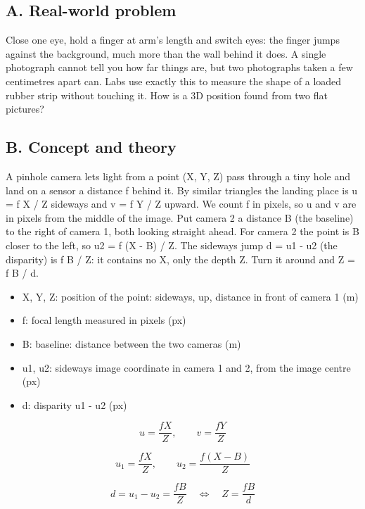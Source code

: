 \documentclass[11pt,a4paper]{article}
\begin{document}
\subsection*{A. Real-world problem}
Close one eye, hold a finger at arm's length and switch eyes: the finger jumps against the background, much more than the wall behind it does. A single photograph cannot tell you how far things are, but two photographs taken a few centimetres apart can. Labs use exactly this to measure the shape of a loaded rubber strip without touching it. How is a 3D position found from two flat pictures?

\subsection*{B. Concept and theory}
A pinhole camera lets light from a point (X, Y, Z) pass through a tiny hole and land on a sensor a distance f behind it. By similar triangles the landing place is u = f X / Z sideways and v = f Y / Z upward. We count f in pixels, so u and v are in pixels from the middle of the image. Put camera 2 a distance B (the baseline) to the right of camera 1, both looking straight ahead. For camera 2 the point is B closer to the left, so u2 = f (X - B) / Z. The sideways jump d = u1 - u2 (the disparity) is f B / Z: it contains no X, only the depth Z. Turn it around and Z = f B / d.

\begin{itemize}[nosep]
\item X, Y, Z: position of the point: sideways, up, distance in front of camera 1 (m)
\item f: focal length measured in pixels (px)
\item B: baseline: distance between the two cameras (m)
\item u1, u2: sideways image coordinate in camera 1 and 2, from the image centre (px)
\item d: disparity u1 - u2 (px)
\end{itemize}

\begin{equation*}
u=\frac{fX}{Z},\qquad v=\frac{fY}{Z}
\end{equation*}

\begin{equation*}
u_1=\frac{fX}{Z},\qquad u_2=\frac{f(X-B)}{Z}
\end{equation*}

\begin{equation*}
d=u_1-u_2=\frac{fB}{Z}\quad\Longleftrightarrow\quad Z=\frac{fB}{d}
\end{equation*}
\end{document}
